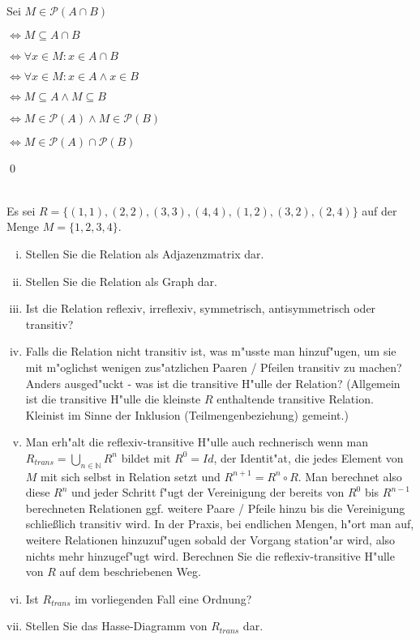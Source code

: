 \begin{loesung}
Sei $M\in\mathscr{P}(A\cap B)$

$\Leftrightarrow M\subseteq A\cap B$

$\Leftrightarrow \forall x\in M:x\in A\cap B$

$\Leftrightarrow \forall x\in M: x\in A\wedge x\in B$

$\Leftrightarrow M\subseteq A\wedge M\subseteq B$

$\Leftrightarrow M\in\mathscr{P}(A)\wedge M\in\mathscr{P}(B)$

$\Leftrightarrow M\in\mathscr{P}(A)\cap\mathscr{P}(B)$

\qed
\end{loesung}

\\
Es sei $R=\{(1,1),(2,2),(3,3),(4,4),(1,2),(3,2),(2,4)\}$ auf der Menge $M=\{1,2,3,4\}$.
\begin{enumerate}[(i)]
\item Stellen Sie die Relation als Adjazenzmatrix dar.
\item Stellen Sie die Relation als Graph dar.
\item Ist die Relation reflexiv, irreflexiv, symmetrisch, antisymmetrisch oder transitiv?
\item Falls die Relation nicht transitiv ist, was m"usste man hinzuf"ugen, um sie mit m"oglichst wenigen zus"atzlichen Paaren / Pfeilen transitiv zu machen? Anders ausged"uckt - was ist die transitive H"ulle der Relation? (Allgemein ist die transitive H"ulle die kleinste $R$ enthaltende transitive Relation. \glqq Klein\grqq ist im Sinne der Inklusion (Teilmengenbeziehung) gemeint.)
\item Man erh"alt die reflexiv-transitive H"ulle auch rechnerisch wenn man $R_{trans}=\bigcup_{n\in\mathbb{N}}R^n$ bildet mit $R^0=Id$, der Identit"at, die jedes Element von $M$ mit sich selbst in Relation setzt und $R^{n+1}=R^n\circ R$. Man berechnet also diese $R^n$ und jeder Schritt f"ugt der Vereinigung der bereits von $R^0$ bis $R^{n-1}$ berechneten Relationen ggf. weitere Paare / Pfeile hinzu bis die Vereinigung schlie\ss lich transitiv wird. In der Praxis, bei endlichen Mengen, h"ort man auf, weitere Relationen hinzuzuf"ugen sobald der Vorgang station"ar wird, also nichts mehr hinzugef"ugt wird. Berechnen Sie die reflexiv-transitive H"ulle von $R$ auf dem beschriebenen Weg.
\item Ist $R_{trans}$ im vorliegenden Fall eine Ordnung?
\item Stellen Sie das Hasse-Diagramm von $R_{trans}$ dar. 
\end{enumerate}

